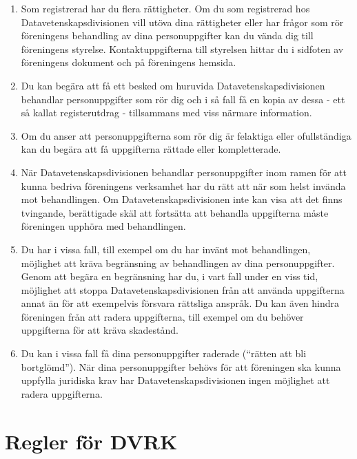 \documentclass{dvd}
\begin{document}
    \begin{enumerate}[label=\arabic* §, ref=\arabic*]
        \item Som registrerad har du flera rättigheter.
		Om du som registrerad hos Datavetenskapsdivisionen vill utöva dina rättigheter eller har frågor som rör föreningens behandling av dina personuppgifter kan du vända dig till föreningens styrelse.
		Kontaktuppgifterna till styrelsen hittar du i sidfoten av föreningens dokument och på föreningens hemsida.

        \item Du kan begära att få ett besked om huruvida Datavetenskapsdivisionen behandlar personuppgifter som rör dig och i så fall få en kopia av dessa - ett så kallat registerutdrag - tillsammans med viss närmare information.

        \item Om du anser att personuppgifterna som rör dig är felaktiga eller ofullständiga kan du begära att få uppgifterna rättade eller kompletterade.

        \item När Datavetenskapsdivisionen behandlar personuppgifter inom ramen för att kunna bedriva föreningens verksamhet har du rätt att när som helst invända mot behandlingen.
		Om Datavetenskapsdivisionen inte kan visa att det finns tvingande, berättigade skäl att fortsätta att behandla uppgifterna måste föreningen upphöra med behandlingen.

        \item Du har i vissa fall, till exempel om du har invänt mot behandlingen, möjlighet att kräva begränsning av behandlingen av dina personuppgifter.
		Genom att begära en begränsning har du, i vart fall under en viss tid, möjlighet att stoppa Datavetenskapsdivisionen från att använda uppgifterna annat än för att exempelvis försvara rättsliga anspråk.
		Du kan även hindra föreningen från att radera uppgifterna, till exempel om du behöver uppgifterna för att kräva skadestånd.

        \item Du kan i vissa fall få dina personuppgifter raderade (``rätten att bli bortglömd'').
		När dina personuppgifter behövs för att föreningen ska kunna uppfylla juridiska krav har Datavetenskapsdivisionen ingen möjlighet att radera uppgifterna.
    \end{enumerate}

\section{Regler för DVRK}
\end{document}
